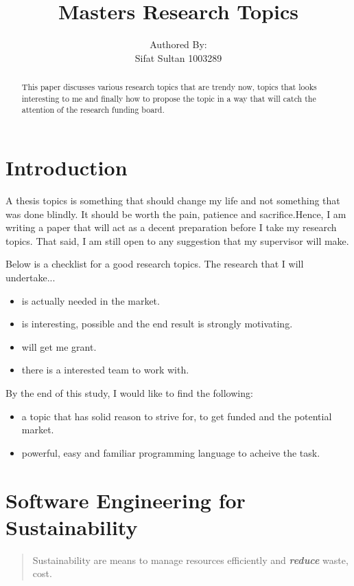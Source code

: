 \documentclass{article}
\title{Masters Research Topics}
\author{
			Authored By:				\\
			Sifat Sultan	1003289 \\			
	   	}
\begin{document}
\maketitle

\tableofcontents

\clearpage

\begin{abstract}
This paper discusses various research topics that are trendy now, topics that looks interesting to me and finally how to propose the topic in a way that will catch the attention of the research funding board.
\end{abstract}

\begin{multicols}{2}
\section{Introduction}
A thesis topics is something that should change my life and not something that was done blindly. It should be worth the pain, patience and sacrifice.Hence, I am writing a paper that will act as a decent preparation before I take my research topics. That said, I am still open to any suggestion that my supervisor will make. 

Below is a checklist for a good research topics. The research that I will undertake...
\begin{itemize}
\item is actually needed in the market.
\item is interesting, possible and the end result is strongly motivating.
\item will get me grant.
\item there is a interested team to work with.
\end{itemize}


By the end of this study, I would like to find the following:
\begin{itemize}
\item a topic that has solid reason to strive for, to get funded and the potential market.
\item powerful, easy and familiar programming language to acheive the task.
\end{itemize}


\section{Software Engineering for Sustainability}
\begin{quotation}
Sustainability are means to manage resources efficiently and \textbf{\textit{reduce}} waste, cost.
\end{quotation}


\end{multicols}
\end{document}
